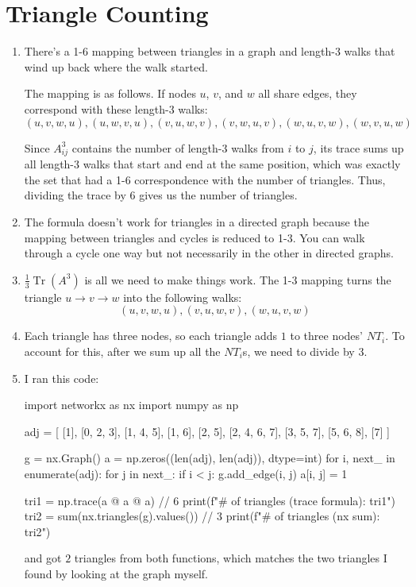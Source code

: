 \documentclass[12pt]{article}
\DeclareMathOperator{\Tr}{Tr}
\begin{document}
\section{Triangle Counting}

\begin{enumerate}
      \item There's a 1-6 mapping between triangles in a graph and length-$3$ walks
            that wind up back where the walk started.

            The mapping is as follows.
            If nodes $u$, $v$, and $w$ all share edges, they correspond with these length-$3$ walks:
            \[(u, v, w, u), (u, w, v, u), (v, u, w, v), (v, w, u, v), (w, u, v, w), (w, v, u, w)\]

            Since $A^3_{ij}$ contains the number of length-$3$ walks from $i$ to $j$,
            its trace sums up all length-$3$ walks that start and end at the same position,
            which was exactly the set that had a 1-6 correspondence with the number of triangles.
            Thus, dividing the trace by $6$ gives us the number of triangles.

      \item The formula doesn't work for triangles in a directed graph because
            the mapping between triangles and cycles is reduced to 1-3.
            You can walk through a cycle one way but not necessarily in the other in directed graphs.

      \item $\frac{1}{3}\Tr\left(A^3\right)$ is all we need to make things work.
            The 1-3 mapping turns the triangle $u \to v \to w$ into the following walks:
            \[(u, v, w, u), (v, u, w, v), (w, u, v, w)\]

      \item Each triangle has three nodes, so each triangle adds $1$ to three nodes' $NT_i$.
            To account for this, after we sum up all the $NT_i$s, we need to divide by $3$.

      \item I ran this code:
            \begin{python}
import networkx as nx
import numpy as np

adj = [
    [1],
    [0, 2, 3],
    [1, 4, 5],
    [1, 6],
    [2, 5],
    [2, 4, 6, 7],
    [3, 5, 7],
    [5, 6, 8],
    [7]
]

g = nx.Graph()
a = np.zeros((len(adj), len(adj)), dtype=int)
for i, next_ in enumerate(adj):
    for j in next_:
        if i < j:
            g.add_edge(i, j)
        a[i, j] = 1

tri1 = np.trace(a @ a @ a) // 6
print(f"# of triangles (trace formula): {tri1}")
tri2 = sum(nx.triangles(g).values()) // 3
print(f"# of triangles (nx sum): {tri2}")
            \end{python}
            and got $2$ triangles from both functions, which matches the two triangles
            I found by looking at the graph myself.
\end{enumerate}
\end{document}
